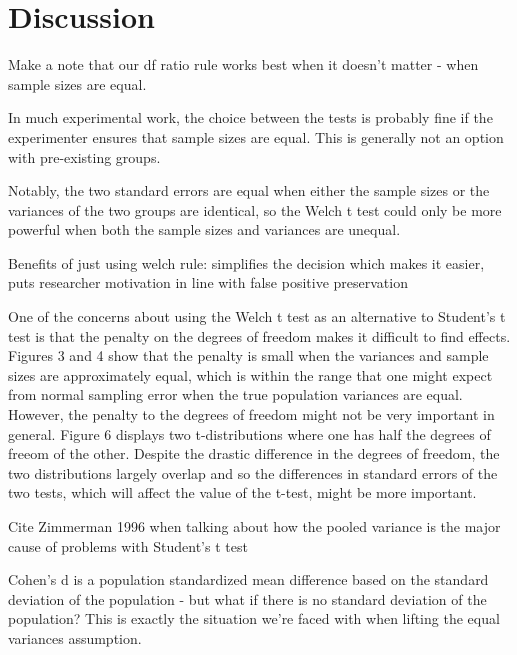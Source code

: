 \documentclass[man,a4paper,noextraspace,apacite]{apa6}\usepackage[]{graphicx}\usepackage[]{color}
\begin{document}
\section{Discussion}
    Make a note that our df ratio rule works best when it doesn't matter - when sample sizes are equal.
    
    In much experimental work, the choice between the tests is probably fine if the experimenter ensures that sample sizes are equal. This is generally not an option with pre-existing groups. 
    
    Notably, the two standard errors are equal when either the sample sizes or the variances of the two groups are identical, so the Welch t test could only be more powerful when both the sample sizes and variances are unequal. 
    
    Benefits of just using welch rule: simplifies the decision which makes it easier, puts researcher motivation in line with false positive preservation

    One of the concerns about using the Welch t test as an alternative to Student's t test is that the penalty on the degrees of freedom makes it difficult to find effects. Figures 3 and 4 show that the penalty is small when the variances and sample sizes are approximately equal, which is within the range that one might expect from normal sampling error when the true population variances are equal. However, the penalty to the degrees of freedom might not be very important in general. Figure 6 displays two t-distributions where one has half the degrees of freeom of the other. Despite the drastic difference in the degrees of freedom, the two distributions largely overlap and so the differences in standard errors of the two tests, which will affect the value of the t-test, might be more important.
    
    Cite Zimmerman 1996 when talking about how the pooled variance is the major cause of problems with Student's t test
    
    Cohen's d is a population standardized mean difference based on the standard deviation of the population - but what if there is no standard deviation of the population? This is exactly the situation we're faced with when lifting the equal variances assumption.
  
\end{document}
